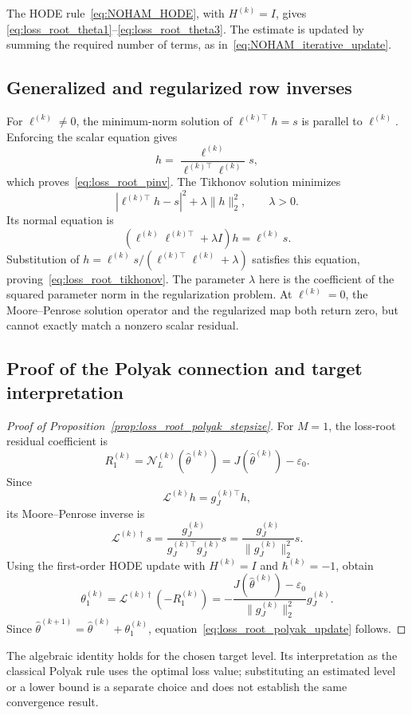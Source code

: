 \documentclass[11pt]{article}
\theoremstyle{remark}
\begin{document}
The HODE rule~\eqref{eq:NOHAM_HODE}, with $H^{(k)}=I$, gives
\eqref{eq:loss_root_theta1}--\eqref{eq:loss_root_theta3}.
The estimate is updated by summing the required number of terms,
as in~\eqref{eq:NOHAM_iterative_update}.

\subsection{Generalized and regularized row inverses}

For $\ell^{(k)}\ne0$, the minimum-norm solution of
$\ell^{(k)\top}h=s$ is parallel to $\ell^{(k)}$.
Enforcing the scalar equation gives
\[
    h=\frac{\ell^{(k)}}{\ell^{(k)\top}\ell^{(k)}}s,
\]
which proves~\eqref{eq:loss_root_pinv}.
The Tikhonov solution minimizes
\[
    |\ell^{(k)\top}h-s|^2+\lambda\|h\|_2^2,
    \qquad\lambda>0.
\]
Its normal equation is
\[
    (\ell^{(k)}\ell^{(k)\top}+\lambda I)h=\ell^{(k)}s.
\]
Substitution of
$h=\ell^{(k)}s/(\ell^{(k)\top}\ell^{(k)}+\lambda)$
satisfies this equation, proving~\eqref{eq:loss_root_tikhonov}.
The parameter $\lambda$ here is the coefficient of the squared
parameter norm in the regularization problem. At $\ell^{(k)}=0$,
the Moore--Penrose solution operator and the regularized map both
return zero, but cannot exactly match a nonzero scalar residual.

\subsection{Proof of the Polyak connection and target interpretation}

\begin{proof}[Proof of Proposition~\ref{prop:loss_root_polyak_stepsize}]
For \(M=1\), the loss-root residual coefficient is
\[
    R_1^{(k)}
    =
    \mathcal{N}_{L}^{(k)}(\hat{\theta}^{(k)})
    =
    J(\hat{\theta}^{(k)})-\varepsilon_0.
\]
Since
\[
    \mathcal{L}^{(k)}h
    =
    g_J^{(k)\top}h,
\]
its Moore--Penrose inverse is
\[
    \mathcal{L}^{(k)\dagger}s
    =
    \frac{g_J^{(k)}}{g_J^{(k)\top}g_J^{(k)}}s
    =
    \frac{g_J^{(k)}}{\|g_J^{(k)}\|_2^2}s.
\]
Using the first-order HODE update with \(H^{(k)}=I\) and \(\hbar^{(k)}=-1\), obtain
\[
    \theta_1^{(k)}
    =
    \mathcal{L}^{(k)\dagger}
    \left(
    -R_1^{(k)}
    \right)
    =
    -
    \frac{
    J(\hat{\theta}^{(k)})-\varepsilon_0
    }{
    \|g_J^{(k)}\|_2^2
    }
    g_J^{(k)}.
\]
Since \(\hat{\theta}^{(k+1)}=\hat{\theta}^{(k)}+\theta_1^{(k)}\), equation~\eqref{eq:loss_root_polyak_update} follows.
\end{proof}
The algebraic identity holds for the chosen target level. Its
interpretation as the classical Polyak rule uses the optimal loss
value; substituting an estimated level or a lower bound is a
separate choice and does not establish the same convergence result.
\end{document}
